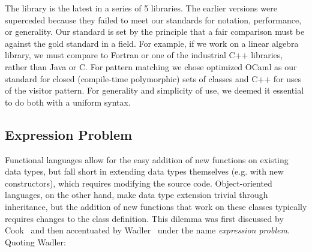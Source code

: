 \documentclass[preprint]{sigplanconf}
\begin{document}
The library is the latest in a series of 5 libraries. The earlier versions were 
superceded because they failed to meet our standards for notation, performance, 
or generality. Our standard is set by the principle that a fair comparison must 
be against the gold standard in a field. For example, if we work on a linear 
algebra library, we must compare to Fortran or one of the industrial C++ 
libraries, rather than Java or C. For pattern matching we chose optimized OCaml 
as our standard for closed (compile-time polymorphic) sets of classes and C++ 
for uses of the visitor pattern. For generality and simplicity of use, we deemed 
it essential to do both with a uniform syntax.

\subsection{Expression Problem}
\label{sec:exp}



Functional languages allow for the easy addition of new functions on existing data 
types, but fall short in extending data types themselves (e.g. with new constructors), 
which requires modifying the source code. Object-oriented languages, on the 
other hand, make data type extension trivial through inheritance, but the addition 
of new functions that work on these classes typically requires changes to the class 
definition. This dilemma was first discussed by Cook~\cite{Cook90} and then 
accentuated by Wadler~\cite{exprproblem} under the name \emph{expression problem}. Quoting Wadler:
\end{document}
